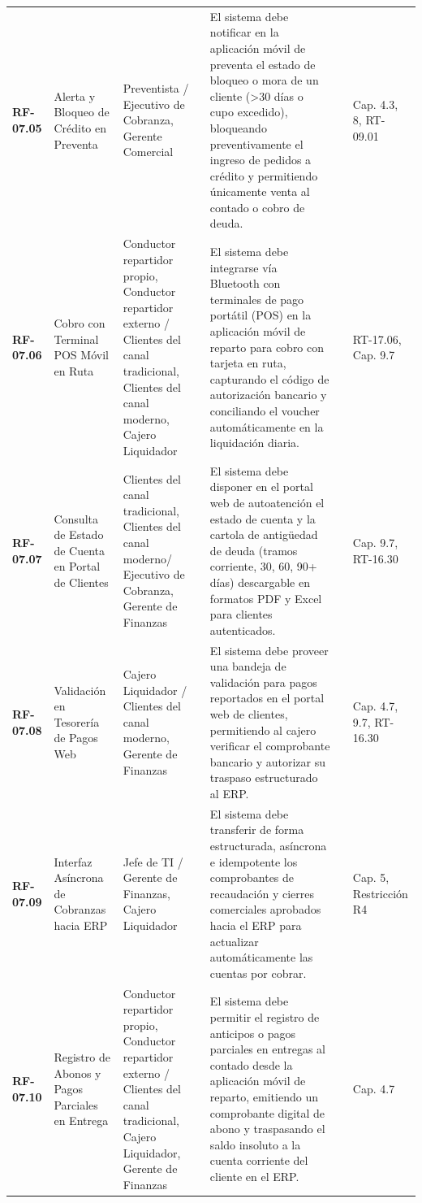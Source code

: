\begin{longtable}{p{1.7cm} p{2.3cm} p{1.9cm} p{5.0cm} p{1.1cm} p{1.9cm}}
\textbf{RF-07.05} & Alerta y Bloqueo de Crédito en Preventa & Preventista / Ejecutivo de Cobranza, Gerente Comercial & El sistema debe notificar en la aplicación móvil de preventa el estado de bloqueo o mora de un cliente (>30 días o cupo excedido), bloqueando preventivamente el ingreso de pedidos a crédito y permitiendo únicamente venta al contado o cobro de deuda. &  & Cap. 4.3, 8, RT-09.01 \\
\textbf{RF-07.06} & Cobro con Terminal POS Móvil en Ruta & Conductor repartidor propio, Conductor repartidor externo / Clientes del canal tradicional, Clientes del canal moderno, Cajero Liquidador & El sistema debe integrarse vía Bluetooth con terminales de pago portátil (POS) en la aplicación móvil de reparto para cobro con tarjeta en ruta, capturando el código de autorización bancario y conciliando el voucher automáticamente en la liquidación diaria. &  & RT-17.06, Cap. 9.7 \\
\textbf{RF-07.07} & Consulta de Estado de Cuenta en Portal de Clientes & Clientes del canal tradicional, Clientes del canal moderno/ Ejecutivo de Cobranza, Gerente de Finanzas & El sistema debe disponer en el portal web de autoatención el estado de cuenta y la cartola de antigüedad de deuda (tramos corriente, 30, 60, 90+ días) descargable en formatos PDF y Excel para clientes autenticados. &  & Cap. 9.7, RT-16.30 \\
\textbf{RF-07.08} & Validación en Tesorería de Pagos Web & Cajero Liquidador / Clientes del canal moderno, Gerente de Finanzas & El sistema debe proveer una bandeja de validación para pagos reportados en el portal web de clientes, permitiendo al cajero verificar el comprobante bancario y autorizar su traspaso estructurado al ERP. &  & Cap. 4.7, 9.7, RT-16.30 \\
\textbf{RF-07.09} & Interfaz Asíncrona de Cobranzas hacia ERP & Jefe de TI / Gerente de Finanzas, Cajero Liquidador & El sistema debe transferir de forma estructurada, asíncrona e idempotente los comprobantes de recaudación y cierres comerciales aprobados hacia el ERP para actualizar automáticamente las cuentas por cobrar. &  & Cap. 5, Restricción R4 \\
\textbf{RF-07.10} & Registro de Abonos y Pagos Parciales en Entrega & Conductor repartidor propio, Conductor repartidor externo / Clientes del canal tradicional, Cajero Liquidador, Gerente de Finanzas & El sistema debe permitir el registro de anticipos o pagos parciales en entregas al contado desde la aplicación móvil de reparto, emitiendo un comprobante digital de abono y traspasando el saldo insoluto a la cuenta corriente del cliente en el ERP. &  & Cap. 4.7 \\

\end{longtable}
